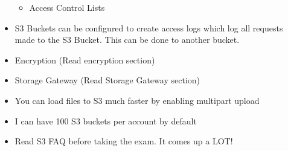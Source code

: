 \documentclass{article}
\begin{document}
\begin{itemize}
\begin{itemize}
	\item
	Access Control Lists
	\end{itemize}

\item
S3 Buckets can be configured to create access logs which log all requests made to the S3 Bucket. This can be done to another bucket.

\item
Encryption (Read encryption section)

\item
Storage Gateway (Read Storage Gateway section)

\item
You can load files to S3 much faster by enabling multipart upload

\item
I can have 100 S3 buckets per account by default

\item
Read S3 FAQ before taking the exam. It comes up a LOT!
\end{itemize}
\end{document}
